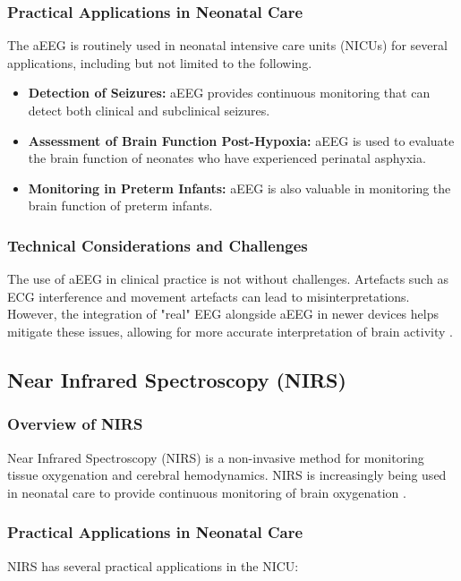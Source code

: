 \documentclass[12pt,journal,compsoc]{IEEEtran}
\begin{document}
\subsubsection{Practical Applications in Neonatal Care}
The aEEG is routinely used in neonatal intensive care units (NICUs) for several applications, including but not limited to the following. 

\begin{itemize}
    \item \textbf{Detection of Seizures:} aEEG provides continuous monitoring that can detect both clinical and subclinical seizures.  
    \item \textbf{Assessment of Brain Function Post-Hypoxia:} aEEG is used to evaluate the brain function of neonates who have experienced perinatal asphyxia.  
    \item \textbf{Monitoring in Preterm Infants:} aEEG is also valuable in monitoring the brain function of preterm infants.  
\end{itemize}

\subsubsection{Technical Considerations and Challenges}
The use of aEEG in clinical practice is not without challenges. Artefacts such as ECG interference and movement artefacts can lead to misinterpretations. However, the integration of "real" EEG alongside aEEG in newer devices helps mitigate these issues, allowing for more accurate interpretation of brain activity \cite{IEEEhowto:toet}.

\subsection{Near Infrared Spectroscopy (NIRS)}

\subsubsection{Overview of NIRS}
Near Infrared Spectroscopy (NIRS) is a non-invasive method for monitoring tissue oxygenation and cerebral hemodynamics. NIRS is increasingly being used in neonatal care to provide continuous monitoring of brain oxygenation \cite{IEEEhowto:toet}.

\subsubsection{Practical Applications in Neonatal Care}
NIRS has several practical applications in the NICU:
\end{document}
